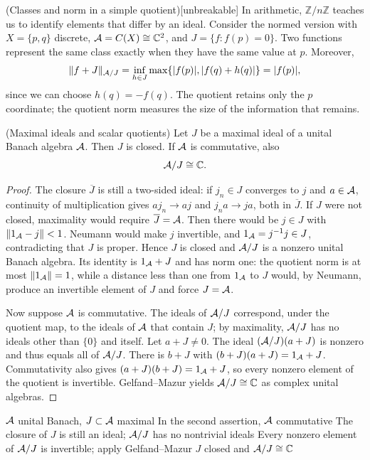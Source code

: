\begin{cthejemplo}{(Classes and norm in a simple quotient)}[unbreakable]
In arithmetic, $\mathbb Z/n\mathbb Z$ teaches us to identify elements
that differ by an ideal. Consider the normed version with
$X=\{p,q\}$ discrete, $\mathcal A=C(X)\cong\mathbb C^2$, and
$J=\{f:f(p)=0\}$. Two functions represent the same class
exactly when they have the same value at $p$. Moreover,
\[
 \|f+J\|_{\mathcal A/J}
 =\inf_{h\in J}\max\{|f(p)|,|f(q)+h(q)|\}
 =|f(p)|,
\]
since we can choose $h(q)=-f(q)$. The quotient retains only the
$p$ coordinate; the quotient norm measures the size of the
information that remains.
\end{cthejemplo}

\begin{cthproposicion}{(Maximal ideals and scalar quotients)}
Let $J$ be a maximal ideal of a unital Banach algebra $\mathcal A$.
Then $J$ is closed. If $\mathcal A$ is commutative, also
\[
 \mathcal A/J\cong\mathbb C.
\]
\end{cthproposicion}

\begin{proof}[Proof]
The closure $\overline J$ is still a two-sided ideal: if
$j_n\in J$ converges to $j$ and $a\in\mathcal A$, continuity of
multiplication gives $aj_n\to aj$ and $j_na\to ja$, both in
$\overline J$. If $J$ were not closed, maximality would require
$\overline J=\mathcal A$. Then there would be $j\in J$ with
$\|1_\mathcal A-j\|<1$. Neumann would make $j$ invertible, and
$1_\mathcal A=j^{-1}j\in J$, contradicting that $J$ is proper.
Hence $J$ is closed and $\mathcal A/J$ is a nonzero unital Banach algebra.
Its identity is $1_\mathcal A+J$ and has norm one: the quotient norm is at most
$\|1_\mathcal A\|=1$, while a distance less than one from $1_\mathcal A$ to $J$
would, by Neumann, produce an invertible element of $J$ and force
$J=\mathcal A$.

Now suppose $\mathcal A$ is commutative. The ideals of $\mathcal A/J$
correspond, under the quotient map, to the ideals
of $\mathcal A$ that contain $J$; by maximality, $\mathcal A/J$ has no
ideals other than $\{0\}$ and itself. Let $a+J\ne0$.
The ideal $(\mathcal A/J)(a+J)$ is nonzero and thus equals all of $\mathcal A/J$.
There is $b+J$ with $(b+J)(a+J)=1_\mathcal A+J$. Commutativity also gives
$(a+J)(b+J)=1_\mathcal A+J$, so every nonzero element
of the quotient is invertible. Gelfand--Mazur yields
$\mathcal A/J\cong\mathbb C$ as complex unital algebras.
\end{proof}

\proofdiagrambranch
{$\mathcal A$ unital Banach, $J\subset\mathcal A$ maximal}
{In the second assertion, $\mathcal A$ commutative}
{The closure of $J$ is still an ideal; $\mathcal A/J$ has no nontrivial ideals}
{Every nonzero element of $\mathcal A/J$ is invertible; apply Gelfand--Mazur}
{$J$ closed and $\mathcal A/J\cong\mathbb C$}

